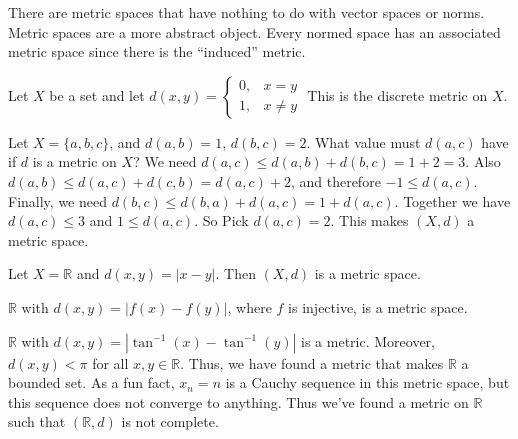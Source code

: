 \documentclass[crop=false,class=article,oneside]{standalone}
\begin{document}
        There are metric spaces that have nothing to do
        with vector spaces or norms. Metric spaces are
        a more abstract object. Every normed space
        has an associated metric space since there
        is the ``induced'' metric.
        \begin{example}
            Let $X$ be a set and let
            $d(x,y)=\begin{cases}%
                        0,&x=y\\%
                        1,&{x}\ne{y}%
                    \end{cases}$
            This is the discrete metric on $X$.
        \end{example}
        \begin{example}
            Let $X=\{a,b,c\}$, and
            $d(a,b)=1$, $d(b,c)=2$. What value
            must $d(a,c)$ have if $d$ is a metric on $X$?
            We need $d(a,c)\leq{d(a,b)+d(b,c)}=1+2=3$.
            Also $d(a,b)\leq{d(a,c)+d(c,b)}=d(a,c)+2$, and
            therefore $-1\leq{d(a,c)}$. Finally, we need
            $d(b,c)\leq{d(b,a)+d(a,c)}=1+d(a,c)$. Together
            we have $d(a,c)\leq{3}$ and $1\leq{d(a,c)}$. So
            Pick $d(a,c)=2$.
            This makes $(X,d)$ a metric space.
        \end{example}
        \begin{example}
            Let $X=\mathbb{R}$ and $d(x,y)=|x-y|$.
            Then $(X,d)$ is a metric space.
        \end{example}
        \begin{example}
            $\mathbb{R}$ with
            $d(x,y)=|f(x)-f(y)|$, where
            $f$ is injective, is a metric space.
        \end{example}
        \begin{example}
            $\mathbb{R}$ with
            $d(x,y)=|\tan^{-1}(x)-\tan^{-1}(y)|$ is a
            metric. Moreover, $d(x,y)<\pi$ for all
            $x,y\in\mathbb{R}$. Thus, we have found
            a metric that makes $\mathbb{R}$ a bounded
            set. As a fun fact, $x_{n}=n$ is a Cauchy
            sequence in this metric space, but
            this sequence does not converge to anything.
            Thus we've found a metric on
            $\mathbb{R}$ such that
            $(\mathbb{R},d)$ is not complete.
        \end{example}
\end{document}

